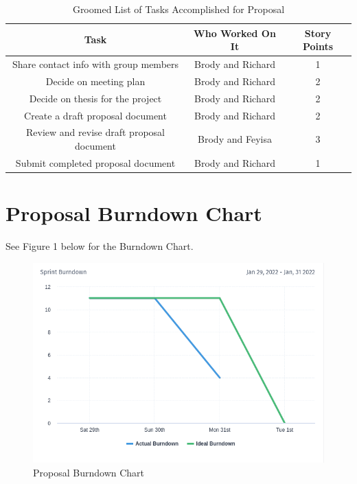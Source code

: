 \documentclass[conference]{IEEEtran}
\begin{document}
\begin{table}
\caption{Groomed List of Tasks Accomplished for Proposal}
\begin{tabular}{|c|c|c|}
\hline
\textbf{Task} & \textbf{Who Worked On It} & \textbf{Story Points} \\ \hline \hline
Share contact info with group members & Brody and Richard & 1 \\ \hline
Decide on meeting plan & Brody and Richard & 2 \\ \hline
Decide on thesis for the project & Brody and Richard & 2 \\ \hline
Create a draft proposal document & Brody and Richard & 2 \\ \hline
Review and revise draft proposal document & Brody and Feyisa & 3 \\ \hline
Submit completed proposal document & Brody and Richard & 1 \\ \hline
\hline
\end{tabular}
\end{table}

\section{Proposal Burndown Chart}
See Figure 1 below for the Burndown Chart.

\begin{figure}
\begin{center}
\includegraphics[scale=0.75]{2022-01-29_to_2022-01-31.png}
\caption{Proposal Burndown Chart}
\end{center}
\end{figure}



\end{document}
